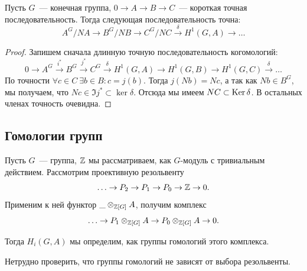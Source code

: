  	\begin{statement} 
 		Пусть $G$~--- конечная группа, $0 \to A \to B \to C$~--- короткая точная последовательность. Тогда следующая последовательность точна: 
 		\[
 			A^{G}/NA \to B^{G}/NB \to C^{G}/NC \xrightarrow{\delta} H^{1}(G, A) \to \ldots
 		\]
 	\end{statement}
 	\begin{proof}
 		Запишем сначала длинную точную последовательность когомологий: 
 		\[
		0 \to A^G \xrightarrow{i^*} B^G \xrightarrow{j^*} C^G \xrightarrow{\delta} H^1(G, A) \to H^1(G, B) \to H^1(G, C) \xrightarrow{\delta} \ldots 
		\]
		По точности $\forall c \in C \ \exists b \in B \colon c = j(b)$. Тогда $j(Nb) = Nc$, а так как $Nb \in B^G$, мы получаем, что $Nc \in \Im{j^*} \subset \ker{\delta}$. Отсюда мы имеем $NC \subset \operatorname{Ker}{\delta}$. В остальных членах точность очевидна.  

 	\end{proof}

 	\subsection{Гомологии групп}

 	Пусть $G$~--- группа, $\mathbb{Z}$ мы рассматриваем, как $G$-модуль с тривиальным действием. Рассмотрим проективную резольвенту 
 	\[
 		\ldots \to P_{2} \to P_{1} \to P_0 \to \mathbb{Z} \to 0. 
 	\]
 	Применим к ней функтор $\_ \otimes_{\mathbb{Z}[G]} A$, получим комплекс 
 	\[
 		\ldots \to P_1 \otimes_{\mathbb{Z}[G]} A \to P_0 \otimes_{\mathbb{Z}[G]} A \to 0.
 	\]

 	Тогда $H_{i}(G, A)$ мы определим, как группы гомологий этого комплекса. 

 	\begin{remark}
 		Нетрудно проверить, что группы гомологий не зависят от выбора резольвенты.  
 	\end{remark}

